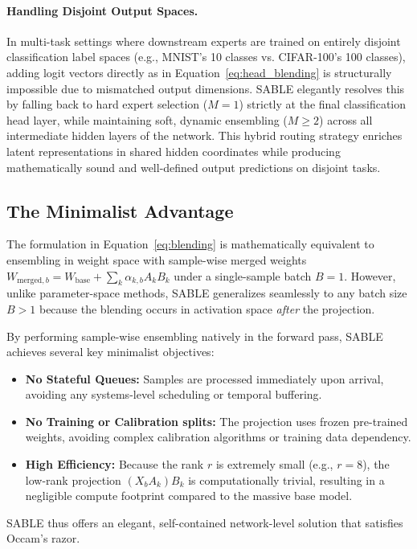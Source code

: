 \paragraph{Handling Disjoint Output Spaces.} In multi-task settings where downstream experts are trained on entirely disjoint classification label spaces (e.g., MNIST's 10 classes vs. CIFAR-100's 100 classes), adding logit vectors directly as in Equation~\ref{eq:head_blending} is structurally impossible due to mismatched output dimensions. SABLE elegantly resolves this by falling back to hard expert selection ($M=1$) strictly at the final classification head layer, while maintaining soft, dynamic ensembling ($M \ge 2$) across all intermediate hidden layers of the network. This hybrid routing strategy enriches latent representations in shared hidden coordinates while producing mathematically sound and well-defined output predictions on disjoint tasks.

\subsection{The Minimalist Advantage}
The formulation in Equation~\ref{eq:blending} is mathematically equivalent to ensembling in weight space with sample-wise merged weights $W_{\text{merged}, b} = W_{\text{base}} + \sum_k \alpha_{k, b} A_k B_k$ under a single-sample batch $B=1$. However, unlike parameter-space methods, SABLE generalizes seamlessly to any batch size $B > 1$ because the blending occurs in activation space \emph{after} the projection.

By performing sample-wise ensembling natively in the forward pass, SABLE achieves several key minimalist objectives:
\begin{itemize}
    \item \textbf{No Stateful Queues:} Samples are processed immediately upon arrival, avoiding any systems-level scheduling or temporal buffering.
    \item \textbf{No Training or Calibration splits:} The projection uses frozen pre-trained weights, avoiding complex calibration algorithms or training data dependency.
    \item \textbf{High Efficiency:} Because the rank $r$ is extremely small (e.g., $r=8$), the low-rank projection $(X_b A_k) B_k$ is computationally trivial, resulting in a negligible compute footprint compared to the massive base model.
\end{itemize}
SABLE thus offers an elegant, self-contained network-level solution that satisfies Occam's razor.

